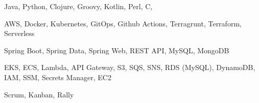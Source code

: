 
\begin{cvskills}

    {Java, Python, Clojure, Groovy, Kotlin, Perl, C, \CC{}} %

    {AWS, Docker, Kubernetes, GitOps, Github Actions, Terragrunt, Terraform, Serverless} %

    {Spring Boot, Spring Data, Spring Web, REST API, MySQL, MongoDB} %

    {EKS, ECS, Lambda, API Gateway, S3, SQS, SNS, RDS (MySQL), DynamoDB, IAM, SSM, Secrets Manager, EC2}

    {Scrum, Kanban, Rally} %

\end{cvskills}
